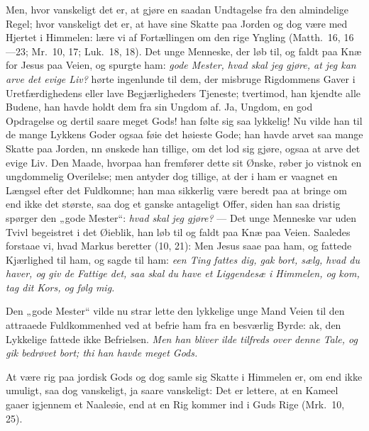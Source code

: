\documentclass[12pt,a4paper]{book}
\begin{document}
Men, hvor vanskeligt det er, at gjøre en saadan Undtagelse fra den almindelige Regel; hvor
vanskeligt det er, at have sine Skatte paa Jorden og dog være med Hjertet i Himmelen: lære
vi af Fortællingen om den rige Yngling (Matth.\ 16, 16---23; Mr.\ 10, 17; Luk.\ 18, 18).
Det unge Menneske, der løb til, og faldt paa Knæ for Jesus paa Veien, og spurgte ham:
\emph{gode Mester, hvad skal jeg gjøre, at jeg kan arve det evige Liv?} hørte ingenlunde
til dem, der misbruge Rigdommens Gaver i Uretfærdighedens eller lave Begjærligheders
Tjeneste; tvertimod, han kjendte alle Budene, han havde holdt
dem fra sin Ungdom af. Ja, Ungdom, en god Opdragelse og dertil saare meget Gods! han følte
sig saa lykkelig! Nu vilde han til de mange Lykkens Goder ogsaa føie det høieste Gode; han
havde arvet saa mange Skatte paa Jorden, nn ønskede han tillige, om det lod sig gjøre,
ogsaa at arve det evige Liv. Den Maade, hvorpaa han fremfører dette sit Ønske, røber jo
vistnok en ungdommelig Overilelse; men antyder dog tillige, at der i ham er vaagnet en
Længsel efter det Fuldkomne; han maa sikkerlig være beredt paa at bringe om end ikke det
største, saa dog et ganske antageligt Offer, siden han saa dristig spørger den „gode
Mester“: \emph{hvad skal jeg gjøre?} --- Det unge Menneske var uden Tvivl begeistret i det
Øieblik, han løb til og faldt paa Knæ paa Veien. Saaledes forstaae vi, hvad Markus
beretter (10, 21): Men Jesus saae paa ham, og fattede Kjærlighed til ham, og sagde til
ham: \emph{een Ting fattes dig, gak bort, sælg, hvad du haver, og giv de Fattige det, saa
skal du have et Liggendesæ i Himmelen, og kom, tag dit Kors, og følg mig.}

Den „gode Mester“ vilde nu strar lette den lykkelige unge Mand Veien til den attraaede
Fuldkommenhed ved at befrie ham fra en besværlig Byrde: ak, den Lykkelige fattede ikke
Befrielsen. \emph{Men han bliver ilde tilfreds over denne Tale, og gik bedrøvet bort; thi
han havde meget Gods.}

At være rig paa jordisk Gods og dog samle sig Skatte i Himmelen er, om end ikke umuligt,
saa dog vanskeligt, ja saare vanskeligt: {\large Det er lettere, at en Kameel gaaer
igjennem et Naaleøie, end at en Rig kommer ind i Guds Rige (Mrk.\ 10, 25).}
\end{document}

